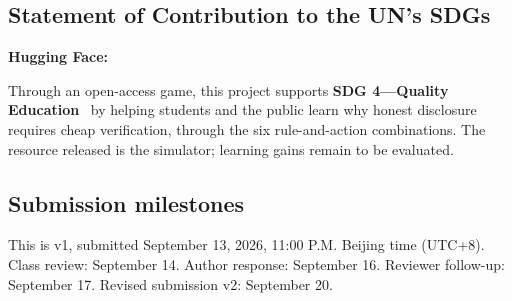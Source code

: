 \subsection*{Statement of Contribution to the UN's SDGs}
\noindent\textbf{Hugging Face:} \DemoLink\par\medskip
\noindent Through an open-access game, this project supports \textbf{SDG 4---Quality Education}~\cite{sdg4} by helping students and the public learn why honest disclosure requires cheap verification, through the six rule-and-action combinations. The resource released is the simulator; learning gains remain to be evaluated.

\subsection*{Submission milestones}
This is v1, submitted September 13, 2026, 11:00 P.M. Beijing time (UTC+8). Class review: September 14. Author response: September 16. Reviewer follow-up: September 17. Revised submission v2: September 20.
